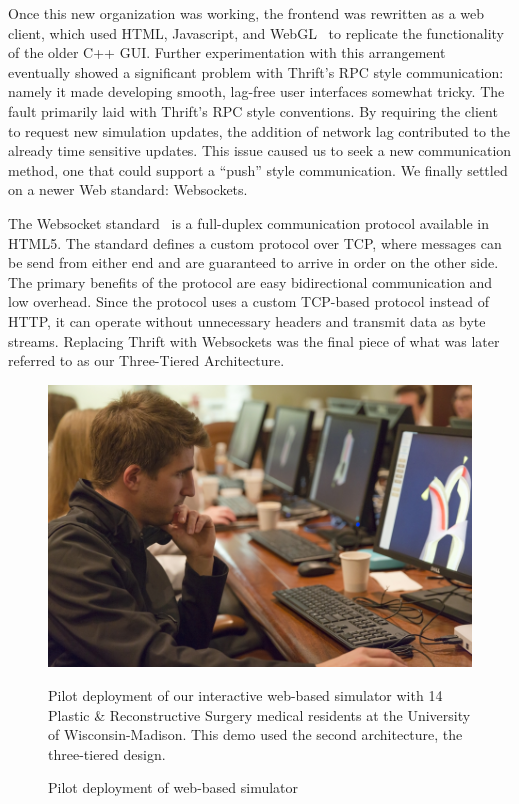  Once this new organization was working, the frontend was rewritten as
 a web client, which used HTML, Javascript, and WebGL~\citep{webgl1.0} to replicate the
 functionality of the older C++ GUI. Further experimentation with this
 arrangement eventually showed a significant problem with Thrift's RPC
 style communication: namely it made developing smooth, lag-free user
 interfaces somewhat tricky. The fault primarily laid with Thrift's
 RPC style conventions. By requiring the client to request new
 simulation updates, the addition of network lag contributed to the
 already time sensitive updates. This issue caused us to seek a new
 communication method, one that could support a ``push'' style
 communication. We finally settled on a newer Web standard:
 Websockets.

 The Websocket standard~\citep{rfc6455} is a full-duplex communication protocol
 available in HTML5. The standard defines a custom protocol over TCP, where
 messages can be send from either end and are guaranteed to
 arrive in order on the other side. The primary benefits of the
 protocol are easy bidirectional communication and low overhead. Since
 the protocol uses a custom TCP-based protocol instead of HTTP, it can
 operate without unnecessary headers and transmit data as byte streams.
 Replacing Thrift with Websockets was the final piece of what was
 later referred to as our Three-Tiered Architecture.


\begin{figure}[t]
\includegraphics[width=\columnwidth]{chapter_gridiron/images/CS_SurgerySim.jpg}
\vspace*{-.18in}
\caption{Pilot deployment of web-based simulator}{Pilot deployment of
  our interactive web-based simulator with 14 Plastic \&
  Reconstructive Surgery medical residents at the University of
  Wisconsin-Madison. This demo used the second architecture, the
  three-tiered design.}
\vspace*{-.18in}
\label{fig:pilot}
\end{figure}
 
